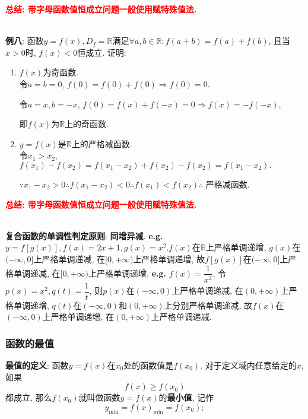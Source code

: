 \documentclass[8pt]{article}
\begin{document}
					\textbf{\textcolor{red}{总结: 带字母函数值恒成立问题一般使用赋特殊值法.}}

				~\\

				\textbf{例八}: 函数$y=f(x), D_f = \mathbb{R}$满足$\forall a,b \in \mathbb{R}: f(a+b)=f(a)+f(b)$, 且当$x>0$时, $f(x)<0$恒成立. 证明:
					\begin{enumerate}[label=(\arabic*)]
						\item $f(x)$为奇函数.
							~\\

							令$a=b=0$, $f(0)=f(0)+f(0) \Rightarrow f(0)=0.$

							令$a=x, b=-x$, $f(0)=f(x)+f(-x)=0 \Rightarrow f(x)=-f(-x),$

							即$f(x)$为$\mathbb{R}$上的奇函数.
							~\\

						\item $y=f(x)$是$\mathbb{R}$上的严格减函数.
							~\\

							令$x_1 > x_2$, $f(x_1) - f(x_2) = f(x_1 - x_2) + f(x_2) - f(x_2) = f(x_1 - x_2).$

							$\because x_1 - x_2 > 0 \therefore f(x_1 - x_2) < 0 \therefore f(x_1) < f(x_2) \therefore$ 严格减函数.

					\end{enumerate}

					\textbf{\textcolor{red}{总结: 带字母函数值恒成立问题一般使用赋特殊值法.}}

				~\\

				\textbf{复合函数的单调性判定原则}: \textbf{同增异减}. \textbf{e.g.} $y=f[g(x)], f(x)=2x+1, g(x)=x^2. f(x)$在$\mathbb{R}$上严格单调递增, $g(x)$在$(-\infty, 0]$上严格单调递减, 在$[0, +\infty)$上严格单调递增, 故$f[g(x)]$在$(-\infty, 0]$上严格单调递减, 在$[0, +\infty)$上严格单调递增. \textbf{e.g.} $f(x)=\dfrac{1}{x^2}$, 令$p(x)=x^2, q(t)=\dfrac{1}{t}$, 则$p(x)$在$(-\infty, 0)$上严格单调递减, 在$(0, +\infty)$上严格单调递增, $q(t)$在$(-\infty, 0)$和$(0, +\infty)$上分别严格单调递减, 故$f(x)$在$(-\infty, 0)$上严格单调递增, 在$(0, +\infty)$上严格单调递减.

			\subsubsection{函数的最值}
				\textbf{最值的定义}: 函数$y=f(x)$在$x_0$处的函数值是$f(x_0)$. 对于定义域内任意给定的$x$, 如果$$f(x)\geq f(x_0)$$都成立, 那么$f(x_0)$就叫做函数$y=f(x)$的\textbf{最小值}, 记作$$y_{\min}=f(x)_{\min}=f(x_0);$$
\end{document}
